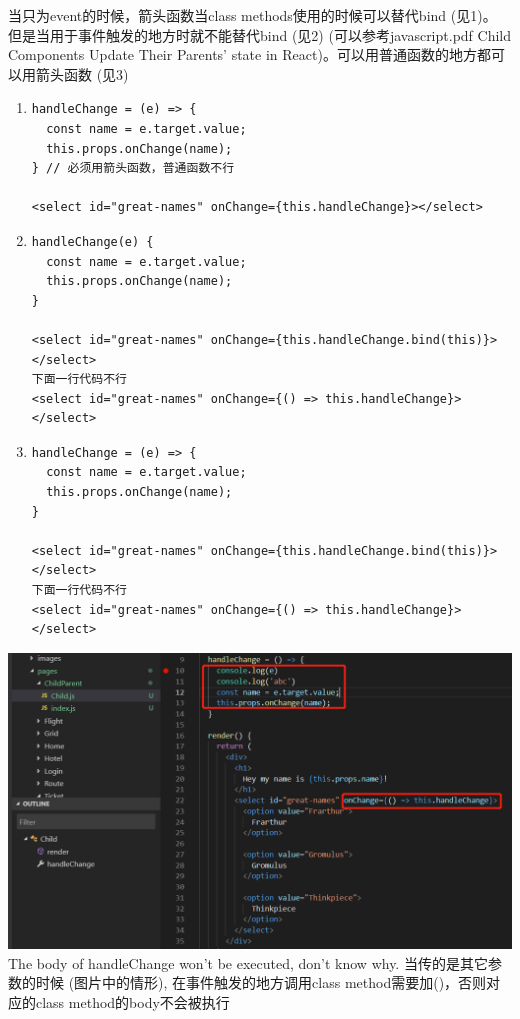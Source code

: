 \documentclass[a4paper, 12pt]{article}
\begin{document}
当只为event的时候，箭头函数当class methods使用的时候可以替代bind (见1)。 但是当用于事件触发的地方时就不能替代bind (见2) (可以参考javascript.pdf Child Components Update Their Parents' state in React)。可以用普通函数的地方都可以用箭头函数 (见3)
\begin{enumerate}
\item \begin{verbatim}
handleChange = (e) => {
  const name = e.target.value;
  this.props.onChange(name);
} // 必须用箭头函数，普通函数不行

<select id="great-names" onChange={this.handleChange}></select>
\end{verbatim}

\item \begin{verbatim}
handleChange(e) {
  const name = e.target.value;
  this.props.onChange(name);
}

<select id="great-names" onChange={this.handleChange.bind(this)}></select>
下面一行代码不行
<select id="great-names" onChange={() => this.handleChange}></select>
\end{verbatim}

\item \begin{verbatim}
handleChange = (e) => {
  const name = e.target.value;
  this.props.onChange(name);
}

<select id="great-names" onChange={this.handleChange.bind(this)}></select>
下面一行代码不行
<select id="great-names" onChange={() => this.handleChange}></select>
\end{verbatim}

\end{enumerate}

\includegraphics[width=6.5in]{./childUpdateParentsState.png}\\
The body of handleChange won't be executed, don't know why. 当传的是其它参数的时候 (图片中的情形), 在事件触发的地方调用class method需要加()，否则对应的class method的body不会被执行
\end{document}

